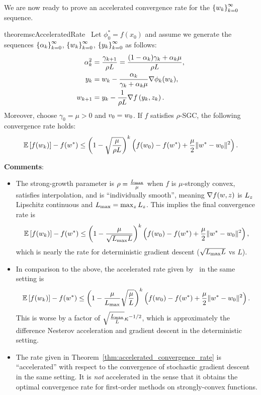 We are now ready to prove an accelerated convergence rate for the \( \left\{w_k\right\}_{k=0}^\infty \) sequence.\\

\begin{restatable}{theorem}{scAcceleratedRate}~\label{thm:accelerated_convergence_rate}
    Let \( \phi^*_0 = f(x_0) \) and assume we generate the sequences \( \left\{\alpha_k\right\}_{k=0}^\infty \), \( \left\{w_k\right\}_{k=0}^\infty \), \( \left\{y_k\right\}_{k=0}^\infty \) as follows:
    \begin{align*}
        \alpha^2_k &= \frac{\gamma_{k+1}}{\rho L } = \frac{(1-\alpha_k)\gamma_k + \alpha_k \mu}{\rho L}, \\
        y_k &= w_k - \frac{\alpha_k}{\gamma_k + \alpha_k \mu} \nabla \phi_k(w_k),\\
        w_{k+1} &= y_k - \frac{1}{\rho L} \nabla f\left(y_k, z_k\right).
    \end{align*}
    Moreover, choose \( \gamma_0 = \mu > 0 \) and \( v_0 = w_0 \).
    If \( f \) satisfies \( \rho \)-SGC, the following convergence rate holds:
    \[ \mathbb{E}\left[f(w_k)\right] - f(w^*) \leq \left(1 - \sqrt{\frac{\mu}{\rho L}}\right)^{k} \left( f(w_0) - f(w^*) + \frac{\mu}{2} \|w^* - w_0\|^2 \right).  \]
\end{restatable}

\textbf{Comments}:
\begin{itemize}
    \item The strong-growth parameter is \( \rho = \frac{L_{\text{max}}}{\mu} \) when \( f \) is \( \mu \)-strongly convex, satisfies interpolation, and is ``individually smooth'', meaning \( \nabla f(w, z) \) is \( L_z \) Lipschitz continuous and \( L_{\text{max}} = \max_z L_z \).
    This implies the final convergence rate is
    \[ \mathbb{E}\left[f(w_k)\right] - f(w^*) \leq \left(1 - \frac{\mu}{\sqrt{L_{\text{max}} L}}\right)^{k} \left( f(w_0) - f(w^*) + \frac{\mu}{2} \|w^* - w_0\|^2 \right), \]
    which is nearly the rate for deterministic gradient descent (\( \sqrt{L_{\text{max}} L} \) vs \( L \)).
    \item In comparison to the above, the accelerated rate given by~\citet{vaswani2019fast} in the same setting is
    \[ \mathbb{E}\left[f(w_k)\right] - f(w^*) \leq \left(1 - \frac{\mu}{L_{\text{max}}} \sqrt{\frac{\mu}{L}}\right)^{k} \left( f(w_0) - f(w^*) + \frac{\mu}{2} \|w^* - w_0\|^2 \right). \]
    This is worse by a factor of \( \sqrt{\frac{L_{\text{max}}}{L}} \kappa^{-1/2} \), which is approximately the difference Nesterov acceleration and gradient descent in the deterministic setting.
    \item The rate given in Theorem~\ref{thm:accelerated_convergence_rate} is ``accelerated'' with respect to the convergence of stochastic gradient descent in the same setting.
    It is \emph{not} accelerated in the sense that it obtains the optimal convergence rate for first-order methods on strongly-convex functions.
\end{itemize}
